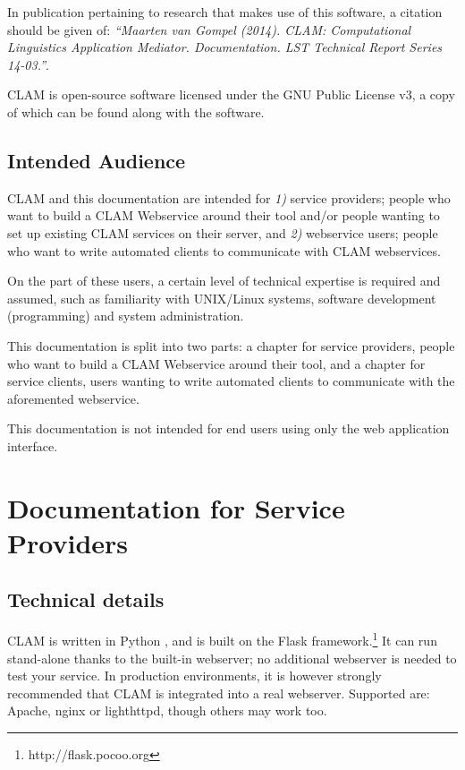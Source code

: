 \documentclass[a4paper,12pt,twoside,openright]{report}
\begin{document}
In publication pertaining to  research that makes use of this software, a citation should
be given of: {\em ``Maarten van Gompel (2014). CLAM: Computational Linguistics
Application Mediator. Documentation. LST Technical Report Series 14-03.''}.

CLAM is open-source software licensed under the GNU Public License v3, a copy
of which can be found along with the software.

\section{Intended Audience}

CLAM and this documentation are intended for \emph{1)} service providers;
people who want to build a CLAM Webservice around their tool and/or people
wanting to set up existing CLAM services on their server, and \emph{2)}
webservice users; people who want to write automated clients to communicate
with CLAM webservices. 

On the part of these users, a certain level of technical expertise is required
and assumed, such as familiarity with UNIX/Linux systems, software development
(programming) and system administration.  

This documentation is split into two parts: a chapter for service providers,
people who want to build a CLAM Webservice around their tool, and a chapter for
service clients, users wanting to write automated clients to communicate with
the aforemented webservice.

This documentation is not intended for end users using only the web application
interface. 

\chapter{Documentation for Service Providers}

\section{Technical details}

CLAM is written in Python \citep{PYTHON}, and is built on the Flask
framework.\footnote{http://flask.pocoo.org} It can run stand-alone thanks to
the built-in webserver; no additional webserver is needed to test your service.
In production environments, it is however strongly recommended that CLAM is
integrated into a real webserver. Supported are: Apache, nginx or lighthttpd,
though others may work too.
\end{document}
